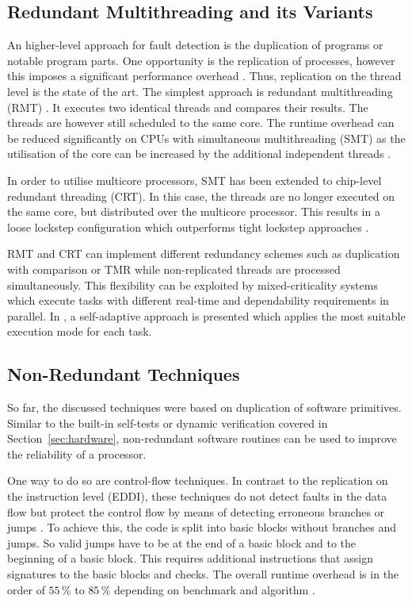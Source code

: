 \documentclass[conference]{IEEEtran}
\begin{document}
\subsection{Redundant Multithreading and its Variants}

An higher-level approach for fault detection is the duplication of programs or notable program parts. One opportunity is the replication of processes, however this imposes a significant performance overhead \cite{Walters2011}. Thus, replication on the thread level is the state of the art. The simplest approach is redundant multithreading (RMT) \cite{Mukherjeea2002}. It executes two identical threads and compares their results. The threads are however still scheduled to the same core. The runtime overhead can be reduced significantly on CPUs with simultaneous multithreading (SMT) as the utilisation of the core can be increased by the additional independent threads \cite{Mukherjeea2002}.

In order to utilise multicore processors, SMT has been extended to chip-level redundant threading (CRT). In this case, the threads are no longer executed on the same core, but distributed over the multicore processor. This results in a loose lockstep configuration which outperforms tight lockstep approaches \cite{Mukherjeea2002}.

RMT and CRT can implement different redundancy schemes such as duplication with comparison or TMR while non-replicated threads are processed simultaneously. This flexibility can be exploited by mixed-criticality systems which execute tasks with different real-time and dependability requirements in parallel. In \cite{Bolchini2013}, a self-adaptive approach is presented which applies the most suitable execution mode for each task.

\subsection{Non-Redundant Techniques}

So far, the discussed techniques were based on duplication of software primitives. Similar to the built-in self-tests or dynamic verification covered in Section~\ref{sec:hardware}, non-redundant software routines can be used to improve the reliability of a processor.

One way to do so are control-flow techniques. In contrast to the replication on the instruction level (EDDI), these techniques do not detect faults in the data flow but protect the control flow by means of detecting erroneous branches or jumps \cite{Chielle2016}. To achieve this, the code is split into basic blocks without branches and jumps. So valid jumps have to be at the end of a basic block and to the beginning of a basic block. This requires additional instructions that assign signatures to the basic blocks and checks. The overall runtime overhead is in the order of $55\,\%$ to $85\,\%$ depending on benchmark and algorithm \cite{Chielle2016}.
\end{document}

